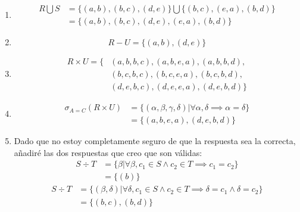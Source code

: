 \begin{enumerate}
	\item \begin{displaymath}
	\begin{split}
		R\bigcup S & = \{ (a, b), (b, c), (d, e)\} \bigcup \{ (b, c), (e, a), (b, d)\}\\
		& = \{ (a, b), (b, c), (d, e), (e, a), (b, d)\}
	\end{split}
	\end{displaymath}
	\item \begin{displaymath}
		R-U = \{(a, b), (d, e)\}
	\end{displaymath}
	\item \begin{displaymath}
	\begin{split}
		R\times U = \{ &(a, b, b, c), (a, b, e, a), (a, b, b, d),\\
		& (b, c, b, c), (b, c, e, a), (b, c, b, d),\\
		& (d, e, b, c), (d, e, e, a), (d, e, b, d)\}
	\end{split}
	\end{displaymath}
	\item \begin{displaymath}
	\begin{split}
		\sigma_{A=C} (R\times U) & = \{(\alpha , \beta , \gamma, \delta) | \forall \alpha , \delta \implies \alpha = \delta \}\\
		& = \{ (a, b, e, a), (d, e, b, d)\}
	\end{split}
	\end{displaymath}
	\item Dado que no estoy completamente seguro de que la respuesta sea la correcta, añadiré las dos respuestas que creo que son válidas:
	\begin{equation}
	\begin{split}
		S\div T & = \{ \beta  |  \forall \beta , c_1 \in S \land c_2 \in T \implies c_1 = c_2 \}\\
		& = \{(b)\}
	\end{split}
	\end{equation}
	\begin{equation}
	\begin{split}
		S\div T & = \{ (\beta , \delta ) |  \forall \delta , c_1 \in S \land c_2 \in T \implies \delta = c_1 \land \delta = c_2 \}\\
		& = \{(b, c), (b, d)\}
	\end{split}
	\end{equation}
\end{enumerate}